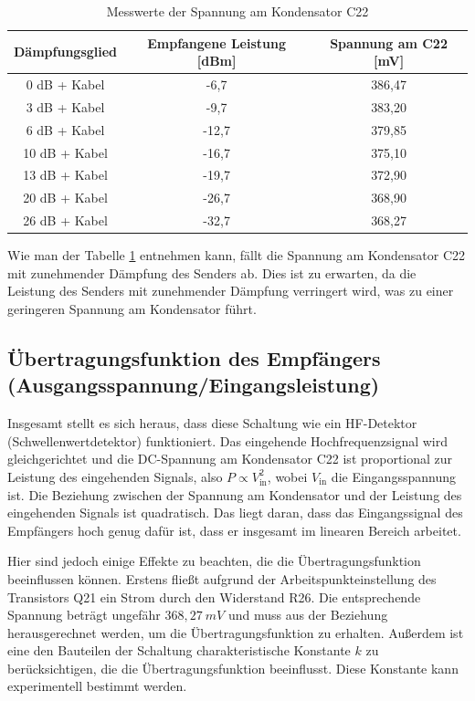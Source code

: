 \begin{table}[H]
    \centering
    \caption{Messwerte der Spannung am Kondensator C22}
    \begin{tabular}{|c|c|c|}
        \hline
        Dämpfungsglied  & Empfangene Leistung [dBm] & Spannung am C22 [mV] \\ \hline
        0 dB + Kabel    & -6,7 & 386,47                 \\ \hline
        3 dB + Kabel    & -9,7 & 383,20                 \\ \hline
        6 dB + Kabel    & -12,7 & 379,85                 \\ \hline
        10 dB + Kabel   & -16,7 & 375,10                 \\ \hline
        13 dB + Kabel   & -19,7 & 372,90                 \\ \hline
        20 dB + Kabel   & -26,7 & 368,90                 \\ \hline
        26 dB + Kabel   & -32,7 & 368,27                 \\ \hline
    \end{tabular}
    \label{tab:spannung}
\end{table}

Wie man der Tabelle \ref{tab:spannung} entnehmen kann, fällt die Spannung am Kondensator C22 mit zunehmender Dämpfung des Senders ab. Dies ist zu erwarten, da die Leistung des Senders mit zunehmender Dämpfung verringert wird, was zu einer geringeren Spannung am Kondensator führt.

\subsection{Übertragungsfunktion des Empfängers (Ausgangsspannung/Eingangsleistung)}
Insgesamt stellt es sich heraus, dass diese Schaltung wie ein HF-Detektor (Schwellenwertdetektor) funktioniert. Das eingehende Hochfrequenzsignal wird gleichgerichtet und die DC-Spannung am Kondensator C22 ist proportional zur Leistung des eingehenden Signals,
also \( P \propto V_\text{in}^2 \), wobei \( V_\text{in} \) die Eingangsspannung ist. Die Beziehung zwischen der Spannung am Kondensator und der Leistung des eingehenden Signals ist quadratisch. Das liegt daran, dass das Eingangssignal des Empfängers hoch genug dafür ist, dass er insgesamt im linearen Bereich arbeitet. 

Hier sind jedoch einige Effekte zu beachten, die die Übertragungsfunktion beeinflussen können. Erstens fließt aufgrund der Arbeitspunkteinstellung des Transistors Q21 ein Strom durch den Widerstand R26. Die entsprechende Spannung beträgt ungefähr $368,27~mV$ und muss aus der Beziehung herausgerechnet werden, um die Übertragungsfunktion zu erhalten. Außerdem ist eine den Bauteilen der Schaltung charakteristische Konstante \( k \) zu berücksichtigen, die die Übertragungsfunktion beeinflusst. Diese Konstante kann experimentell bestimmt werden.

